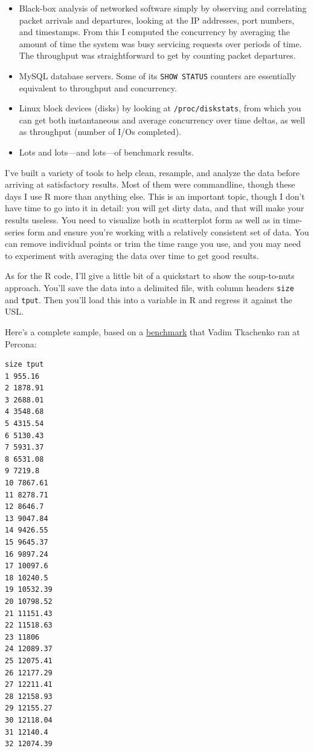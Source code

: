 \documentclass{vivid_layout}
\begin{document}
\begin{itemize}
\item Black-box analysis of networked software simply by observing and
correlating packet arrivals and departures, looking at the IP addresses, port
numbers, and timestamps. From this I computed the concurrency by averaging the
amount of time the system was busy servicing requests over periods of time. The
throughput was straightforward to get by counting packet departures.
\item MySQL database servers. Some of its \texttt{SHOW STATUS} counters are
essentially equivalent to throughput and concurrency.
\item Linux block devices (disks) by looking at \texttt{/proc/diskstats}, from
which you can get both instantaneous and average concurrency over time deltas,
as well as throughput (number of I/Os completed).
\item Lots and lots---and lots---of benchmark results.
\end{itemize}

I've built a variety of tools to help clean, resample, and analyze the data
before arriving at satisfactory results. Most of them were commandline, though
these days I use R more than anything else. This is an important topic, though I
don't have time to go into it in detail: you will get dirty data, and that will
make your results useless. You need to visualize both in scatterplot form as
well as in time-series form and ensure you're working with a relatively
consistent set of data. You can remove individual points or trim the time range
you use, and you may need to experiment with averaging the data over time to get
good results.

As for the R code, I'll give a little bit of a quickstart to show the
soup-to-nuts approach.  You'll save the data into a delimited file, with column
headers \texttt{size} and \texttt{tput}. Then you'll load this into a variable
in R and regress it against the USL.

Here's a complete sample, based on a
\href{https://www.percona.com/docs/wiki/benchmark:cisco:scale:start}{benchmark}
that Vadim Tkachenko ran at Percona:

\begin{verbatim}
size tput
1 955.16
2 1878.91
3 2688.01
4 3548.68
5 4315.54
6 5130.43
7 5931.37
8 6531.08
9 7219.8
10 7867.61
11 8278.71
12 8646.7
13 9047.84
14 9426.55
15 9645.37
16 9897.24
17 10097.6
18 10240.5
19 10532.39
20 10798.52
21 11151.43
22 11518.63
23 11806
24 12089.37
25 12075.41
26 12177.29
27 12211.41
28 12158.93
29 12155.27
30 12118.04
31 12140.4
32 12074.39
\end{verbatim}
\end{document}
